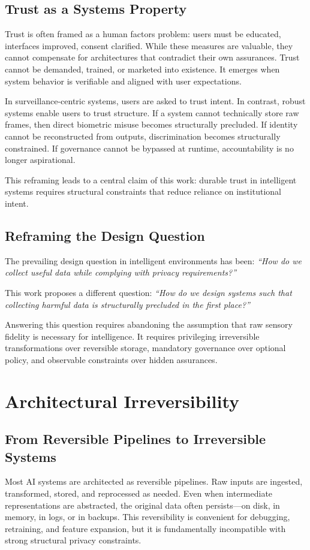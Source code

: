 \documentclass[conference]{IEEEtran}
\begin{document}
\subsection{Trust as a Systems Property}
Trust is often framed as a human factors problem: users must be educated, interfaces improved, consent clarified. While these measures are valuable, they cannot compensate for architectures that contradict their own assurances. Trust cannot be demanded, trained, or marketed into existence. It emerges when system behavior is verifiable and aligned with user expectations.

In surveillance-centric systems, users are asked to trust intent. In contrast, robust systems enable users to trust structure. If a system cannot technically store raw frames, then direct biometric misuse becomes structurally precluded. If identity cannot be reconstructed from outputs, discrimination becomes structurally constrained. If governance cannot be bypassed at runtime, accountability is no longer aspirational.

This reframing leads to a central claim of this work: durable trust in intelligent systems requires structural constraints that reduce reliance on institutional intent.

\subsection{Reframing the Design Question}
The prevailing design question in intelligent environments has been:
\textit{``How do we collect useful data while complying with privacy requirements?''}

This work proposes a different question:
\textit{``How do we design systems such that collecting harmful data is structurally precluded in the first place?''}

Answering this question requires abandoning the assumption that raw sensory fidelity is necessary for intelligence. It requires privileging irreversible transformations over reversible storage, mandatory governance over optional policy, and observable constraints over hidden assurances.

\section{Architectural Irreversibility}

\subsection{From Reversible Pipelines to Irreversible Systems}
Most AI systems are architected as reversible pipelines. Raw inputs are ingested, transformed, stored, and reprocessed as needed. Even when intermediate representations are abstracted, the original data often persists---on disk, in memory, in logs, or in backups. This reversibility is convenient for debugging, retraining, and feature expansion, but it is fundamentally incompatible with strong structural privacy constraints.
\end{document}
